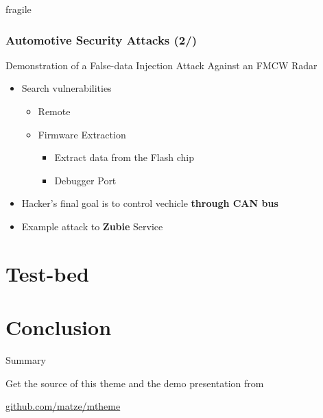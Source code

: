 \documentclass[10pt,aspectratio=169]{beamer}
\begin{document}
\begin{frame}{fragile}
    \frametitle{Automotive Security Attacks (2/)}

    Demonstration of a False-data Injection Attack Against an FMCW Radar
    \begin{itemize}
        \item Search vulnerabilities
            \begin{itemize}
                \item Remote
                \item Firmware Extraction
                    \begin{itemize}
                        \item Extract data from the Flash chip
                        \item Debugger Port
                    \end{itemize}
            \end{itemize}
        \item Hacker's final goal is to control vechicle \textbf{through CAN bus}
        \item Example attack to \textbf{Zubie} Service
    \end{itemize}

\end{frame}


\section{Test-bed}


\section{Conclusion}

\begin{frame}{Summary}

  Get the source of this theme and the demo presentation from

  \begin{center}\url{github.com/matze/mtheme}\end{center}


  \begin{center}\ccbysa\end{center}

\end{frame}
\end{document}
